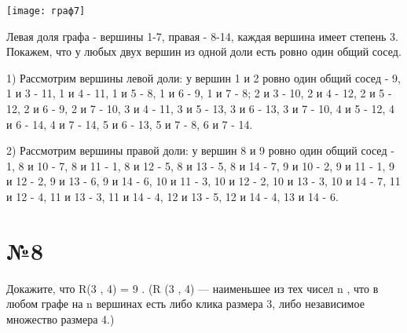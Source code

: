 \documentclass[a4paper, 16pt]{article}
\newenvironment{solution}[1][Решение]{%
	\begin{trivlist}
		\item[\hskip \labelsep {\bfseries #1:}]
		\item \hspace{15pt}
	}{
	\end{trivlist}
}
\begin{document}
		\begin{solution}
			\texttt{[image: граф7]}
			
			Левая доля графа - вершины 1-7, правая - 8-14, каждая вершина имеет степень 3. Покажем, что у любых двух вершин из одной доли есть ровно один общий сосед. 
			
			1) Рассмотрим вершины левой доли: у вершин 1 и 2 ровно один общий сосед - 9, 1 и 3 - 11, 1 и 4 - 11, 1 и 5 - 8, 1 и 6 - 9, 1 и 7 - 8; 2 и 3 - 10, 2 и 4 - 12, 2 и 5 - 12, 2 и 6 - 9, 2 и 7 - 10, 3 и 4 - 11, 3 и 5 - 13, 3 и 6 - 13, 3 и 7 - 10, 4 и 5 - 12, 4 и 6 - 14, 4 и 7 - 14, 5 и 6 - 13, 5 и 7 - 8, 6 и 7 - 14.
			
			2) Рассмотрим вершины правой доли: у вершин 8 и 9 ровно один общий сосед - 1, 8 и 10 - 7, 8 и 11 - 1, 8 и 12 - 5, 8 и 13 - 5, 8 и 14 - 7, 9 и 10 - 2, 9 и 11 - 1, 9 и 12 - 2, 9 и 13 - 6, 9 и 14 - 6, 10 и 11 - 3, 10 и 12 - 2, 10 и 13 - 3, 10 и 14 - 7, 11 и 12 - 4, 11 и 13 - 3, 11 и 14 - 4, 12 и 13 - 5, 12 и 14 - 4, 13 и 14 - 6.
		\end{solution}






	
	\section*{№8}
	
	Докажите, что
	R(3
	,
	4) = 9
	. (R
	(3
	,
	4)
	— наименьшее из тех чисел
	n
	, что в любом графе на
	n
	вершинах
	есть либо клика размера 3, либо независимое множество размера 4.)
	
\end{document}
